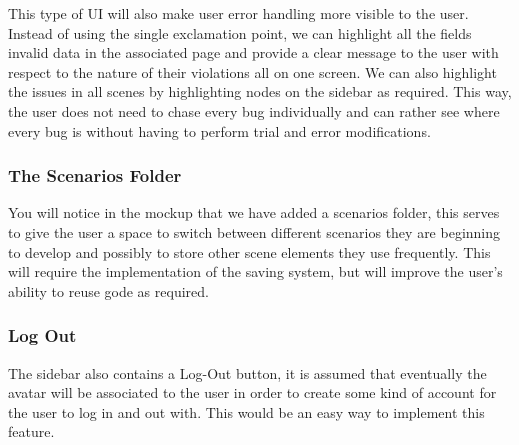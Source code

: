 \documentclass[sigconf]{acmart}
\begin{document}
This type of UI will also make user error handling more visible to the user. Instead of using the single exclamation point, we can highlight all the fields invalid data in the associated page and provide a clear message to the user with respect to the nature of their violations all on one screen. We can also highlight the issues in all scenes by highlighting nodes on the sidebar as required. This way, the user does not need to chase every bug individually and can rather see where every bug is without having to perform trial and error modifications.

\subsubsection{The Scenarios Folder}
You will notice in the mockup that we have added a scenarios folder, this serves to give the user a space to switch between different scenarios they are beginning to develop and possibly to store other scene elements they use frequently. This will require the implementation of the saving system, but will improve the user's ability to reuse gode as required.

\subsubsection{Log Out}
The sidebar also contains a Log-Out button, it is assumed that eventually the avatar will be associated to the user in order to create some kind of account for the user to log in and out with. This would be an easy way to implement this feature.
\end{document}
